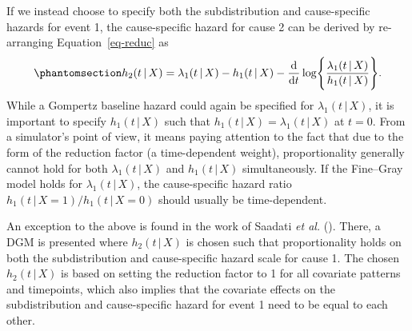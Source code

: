 \documentclass[
  letterpaper,
  paper=240mm:170mm,
  twoside=true,
  open=right,
  fontsize=10pt,
  pagesize=false,
  BCOR=15mm,
  DIV=14,
  headinclude=true,
  footinclude=false,
  headsepline=on]{scrbook}
\newcommand{\given}{\,|\,}
\newcommand\diff{\mathop{}\!\mathrm{d}}
\begin{document}
If we instead choose to specify both the subdistribution and
cause-specific hazards for event 1, the cause-specific hazard for cause
2 can be derived by re-arranging Equation~\ref{eq-reduc} as
\begin{equation}\phantomsection\label{eq-sdh1-csh1}{
h_2(t \given X) = \lambda_1(t \given X) - h_1(t \given X) - \frac{\diff}{\diff t} \log \Biggl\{ \frac{\lambda_1(t \given X)}{h_1(t \given X)}\Biggr\}.
}\end{equation} While a Gompertz baseline hazard could again be
specified for \(\lambda_1(t \given X)\), it is important to specify
\(h_1(t \given X)\) such that
\(h_1(t \given X) = \lambda_1(t \given X)\) at \(t = 0\). From a
simulator's point of view, it means paying attention to the fact that
due to the form of the reduction factor (a time-dependent weight),
proportionality generally cannot hold for both \(\lambda_1(t \given X)\)
and \(h_1(t \given X)\) simultaneously. If the Fine--Gray model holds
for \(\lambda_1(t \given X)\), the cause-specific hazard ratio
\(h_1(t \given X=1) / h_1(t \given X=0)\) should usually be
time-dependent.

An exception to the above is found in the work of Saadati \emph{et al.}
(). There, a
DGM is presented where \(h_2(t \given X)\) is chosen such that
proportionality holds on both the subdistribution and cause-specific
hazard scale for cause 1. The chosen \(h_2(t \given X)\) is based on
setting the reduction factor to 1 for all covariate patterns and
timepoints, which also implies that the covariate effects on the
subdistribution and cause-specific hazard for event 1 need to be equal
to each other.
\end{document}
